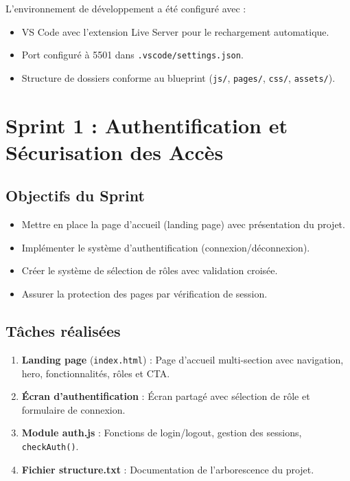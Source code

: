 \documentclass[12pt,a4paper,twoside]{report}
\begin{document}
L'environnement de développement a été configuré avec :
\begin{itemize}
    \item VS Code avec l'extension Live Server pour le rechargement automatique.
    \item Port configuré à 5501 dans \texttt{.vscode/settings.json}.
    \item Structure de dossiers conforme au blueprint (\texttt{js/}, \texttt{pages/}, \texttt{css/}, \texttt{assets/}).
\end{itemize}

\section{Sprint 1 : Authentification et Sécurisation des Accès}

\subsection{Objectifs du Sprint}

\begin{itemize}
    \item Mettre en place la page d'accueil (landing page) avec présentation du projet.
    \item Implémenter le système d'authentification (connexion/déconnexion).
    \item Créer le système de sélection de rôles avec validation croisée.
    \item Assurer la protection des pages par vérification de session.
\end{itemize}

\subsection{Tâches réalisées}

\begin{enumerate}
    \item \textbf{Landing page} (\texttt{index.html}) : Page d'accueil multi-section avec navigation, hero, fonctionnalités, rôles et CTA.
    \item \textbf{Écran d'authentification} : Écran partagé avec sélection de rôle et formulaire de connexion.
    \item \textbf{Module auth.js} : Fonctions de login/logout, gestion des sessions, \texttt{checkAuth()}.
    \item \textbf{Fichier structure.txt} : Documentation de l'arborescence du projet.
\end{enumerate}
\end{document}
